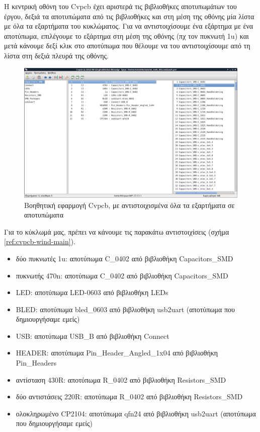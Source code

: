 \documentclass[a4paper]{article}
\begin{document}
Η κεντρική οθόνη του \textenglish{Cvpcb} έχει αριστερά τις βιβλιοθήκες αποτυπωμάτων του έργου, δεξιά τα αποτυπώματα από τις βιβλιοθήκες και στη μέση της οθόνης μία λίστα με όλα τα εξαρτήματα του κυκλώματος. Για να αντιστοιχίσουμε ένα εξάρτημα με ένα αποτύπωμα, επιλέγουμε το εξάρτημα στη μέση της οθόνης (πχ τον πυκνωτή 1u) και μετά κάνουμε δεξί κλικ στο αποτύπωμα που θέλουμε να του αντιστοιχίσουμε από τη λίστα στη δεξιά πλευρά της οθόνης.

\begin{figure}
  \begin{center}
    \includegraphics[width=.9\textwidth]{img/cvpcb-wind-main.png}
    \caption{Βοηθητική εφαρμογή \textenglish{Cvpcb}, με αντιστοιχισμένα όλα τα εξαρτήματα σε αποτυπώματα}
    \label{fig:cvpcb-wind-main}
  \end{center}
\end{figure}

Για το κύκλωμά μας, πρέπει να κάνουμε τις παρακάτω αντιστοιχίσεις (σχήμα \ref{ref:cvpcb-wind-main}).

\begin{itemize}
    \item δύο πυκνωτές 1u: αποτύπωμα C\_0402 από βιβλιοθήκη Capacitors\_SMD 
    \item πυκνωτής 470n: αποτύπωμα C\_0402 από βιβλιοθήκη Capacitors\_SMD
    \item LED: αποτύπωμα LED-0603 από βιβλιοθήκη LEDs
    \item BLED: αποτύπωμα bled\_0603 από βιβλιοθήκη usb2uart (αποτύπωμα που δημιουργήσαμε εμείς)
    \item USB: αποτύπωμα USB\_B από βιβλιοθήκη Connect
    \item HEADER: αποτύπωμα Pin\_Header\_Angled\_1x04 από βιβλιοθήκη Pin\_Headers
    \item αντίσταση 430R: αποτύπωμα R\_0402 από βιβλιοθήκη Resistors\_SMD 
    \item δύο αντιστάσεις 220R: αποτύπωμα R\_0402 από βιβλιοθήκη Resistors\_SMD 
    \item ολοκληρωμένο CP2104: αποτύπωμα qfn24 από βιβλιοθήκη usb2uart (αποτύπωμα που δημιουργήσαμε εμείς)
\end{itemize}
\end{document}
